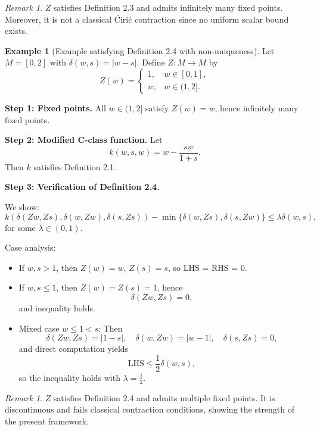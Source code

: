\documentclass[11pt,reqno]{amsart}
\theoremstyle{definition}
\newtheorem{example}[theorem]{Example}
\theoremstyle{remark}
\newtheorem{remark}[theorem]{Remark}
\numberwithin{equation}{section}
\begin{document}
		\begin{remark}  
		$Z$ satisfies Definition 2.3 and admits infinitely many fixed points.  
		Moreover, it is not a classical Ćirić contraction since no uniform scalar bound exists.
	\end{remark}
	\bigskip
	
	\begin{example}[Example satisfying Definition 2.4 with non-uniqueness]
		Let $M = [0,2]$ with $\delta(w,s)=|w-s|$. Define $Z:M \to M$ by
		\[
		Z(w) =
		\begin{cases}
			1, & w \in [0,1], \\
			w, & w \in (1,2].
		\end{cases}
		\]
		
		\textbf{Step 1: Fixed points.}  
		All $w \in (1,2]$ satisfy $Z(w)=w$, hence infinitely many fixed points.
		
		\medskip
		
		\textbf{Step 2: Modified C-class function.}  
		Let
		\[
		k(w,s,w) = w - \frac{sw}{1+s}.
		\]
		Then $k$ satisfies Definition 2.1.
		
		\medskip
		
		\textbf{Step 3: Verification of Definition 2.4.}  
		
		We show:
		\[
		k(\delta(Zw,Zs),\delta(w,Zw),\delta(s,Zs)) - \min\{\delta(w,Zs),\delta(s,Zw)\}
		\leq \lambda \delta(w,s),
		\]
		for some $\lambda \in (0,1)$.
		
		\medskip
		
		Case analysis:
		
		\begin{itemize}
			\item If $w,s > 1$, then $Z(w)=w$, $Z(s)=s$, so LHS = RHS = 0.
			
			\item If $w,s \leq 1$, then $Z(w)=Z(s)=1$, hence
			\[
			\delta(Zw,Zs)=0,
			\]
			and inequality holds.
			
			\item Mixed case $w \leq 1 < s$:  
			Then
			\[
			\delta(Zw,Zs) = |1 - s|, \quad \delta(w,Zw)=|w-1|, \quad \delta(s,Zs)=0,
			\]
			and direct computation yields
			\[
			\text{LHS} \leq \frac{1}{2} \delta(w,s),
			\]
			so the inequality holds with $\lambda = \frac{1}{2}$.
		\end{itemize}
\end{example}	
		\medskip
		
		\begin{remark}  
		$Z$ satisfies Definition 2.4 and admits multiple fixed points.  
		It is discontinuous and fails classical contraction conditions, showing the strength of the present framework.
	\end{remark}
	
\end{document}
